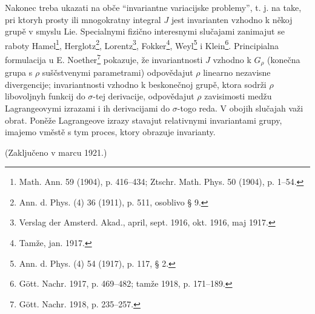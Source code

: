 \documentclass[11pt]{article}
\begin{document}
Nakonec treba ukazati na obče ``invariantne variacijske problemy'', t. j. na take, pri ktoryh prosty ili mnogokratny integral $J$ jest invarianten vzhodno k někoj grupě v smyslu Lie. Specialnymi fizično interesnymi slučajami zanimajut se raboty Hamel\footnote{Math. Ann. 59 (1904), p. 416--434; Ztschr. Math. Phys. 50 (1904), p. 1--54.}, Herglotz\footnote{Ann. d. Phys. (4) 36 (1911), p. 511, osoblivo § 9.}, Lorentz\footnote{Verslag der Amsterd. Akad., april, sept. 1916, okt. 1916, maj 1917.}, Fokker\footnote{Tamže, jan. 1917.}, Weyl\footnote{Ann. d. Phys. (4) 54 (1917), p. 117, § 2.} i Klein\footnote{Gött. Nachr. 1917, p. 469--482; tamže 1918, p. 171--189.}. Principialna formulacija u E. Noether\footnote{Gött. Nachr. 1918, p. 235--257.} pokazuje, že invariantnosti $J$ vzhodno k $G_\rho$ (konečna grupa s $\rho$ suščstvenymi parametrami) odpovědajut $\rho$ linearno nezavisne divergencije; invariantnosti vzhodno k beskonečnoj grupě, ktora sodrži $\rho$ libovoljnyh funkcij do $\sigma$-tej derivacije, odpovědajut $\rho$ zavisimosti medžu Lagrangeovymi izrazami i ih derivacijami do $\sigma$-togo reda. V obojih slučajah važi obrat. Poněže Lagrangeove izrazy stavajut relativnymi invariantami grupy, imajemo vměstě s tym proces, ktory obrazuje invarianty.

\begin{center}
(Zaključeno v marcu 1921.)
\end{center}
\end{document}
